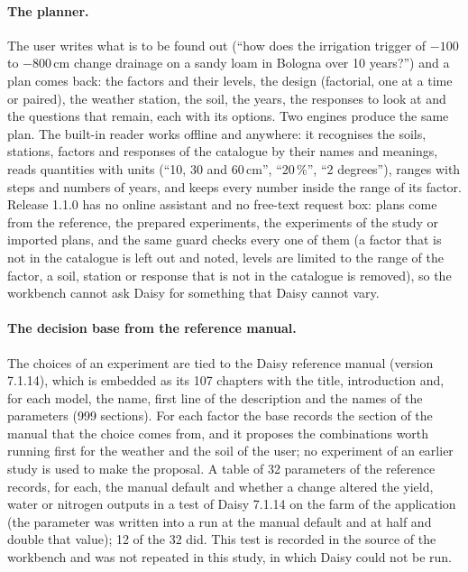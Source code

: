 \documentclass[preprint,12pt]{elsarticle}
\begin{document}
\paragraph{The planner.}\label{sec:planner}
The user writes what is to be found out (``how does the irrigation trigger of $-100$ to $-800$\,cm change drainage on a sandy loam in Bologna over 10 years?'') and a plan comes back: the factors and their levels, the design (factorial, one at a time or paired), the weather station, the soil, the years, the responses to look at and the questions that remain, each with its options. Two engines produce the same plan. The built-in reader works offline and anywhere: it recognises the soils, stations, factors and responses of the catalogue by their names and meanings, reads quantities with units (``10, 30 and 60\,cm'', ``20\,\%'', ``2 degrees''), ranges with steps and numbers of years, and keeps every number inside the range of its factor. Release 1.1.0 has no online assistant and no free-text request box: plans come from the reference, the prepared experiments, the experiments of the study or imported plans, and the same guard checks every one of them (a factor that is not in the catalogue is left out and noted, levels are limited to the range of the factor, a soil, station or response that is not in the catalogue is removed), so the workbench cannot ask Daisy for something that Daisy cannot vary.

\paragraph{The decision base from the reference manual.}
The choices of an experiment are tied to the Daisy reference manual (version 7.1.14), which is embedded as its 107 chapters with the title, introduction and, for each model, the name, first line of the description and the names of the parameters (999 sections). For each factor the base records the section of the manual that the choice comes from, and it proposes the combinations worth running first for the weather and the soil of the user; no experiment of an earlier study is used to make the proposal. A table of 32 parameters of the reference records, for each, the manual default and whether a change altered the yield, water or nitrogen outputs in a test of Daisy 7.1.14 on the farm of the application (the parameter was written into a run at the manual default and at half and double that value); 12 of the 32 did. This test is recorded in the source of the workbench and was not repeated in this study, in which Daisy could not be run.
\end{document}
